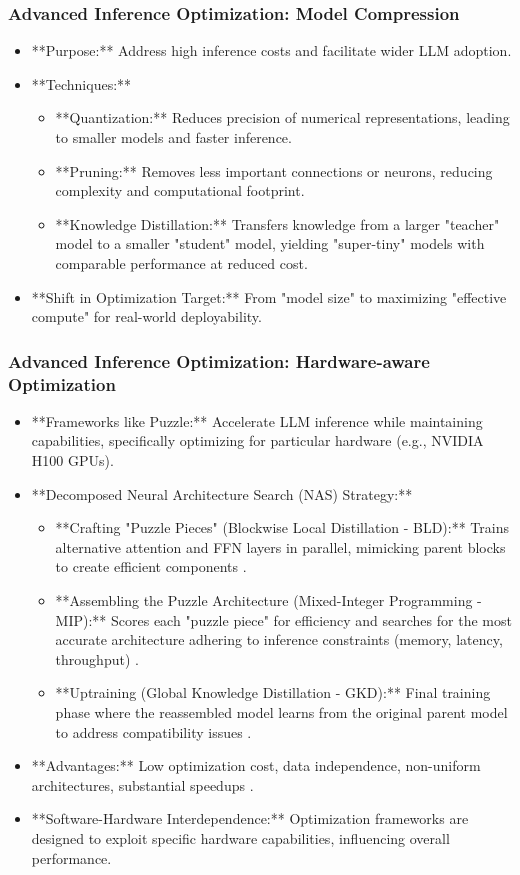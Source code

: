 \documentclass{beamer}       %
\begin{document}
\begin{frame}
    \frametitle{Advanced Inference Optimization: Model Compression}
    \begin{itemize}
        \item **Purpose:** Address high inference costs and facilitate wider LLM adoption.
        \item **Techniques:**
        \begin{itemize}
            \item **Quantization:** Reduces precision of numerical representations, leading to smaller models and faster inference.
            \item **Pruning:** Removes less important connections or neurons, reducing complexity and computational footprint.
            \item **Knowledge Distillation:** Transfers knowledge from a larger "teacher" model to a smaller "student" model, yielding "super-tiny" models with comparable performance at reduced cost.
        \end{itemize}
        \item **Shift in Optimization Target:** From "model size" to maximizing "effective compute" for real-world deployability.
    \end{itemize}
\end{frame}

\begin{frame}
    \frametitle{Advanced Inference Optimization: Hardware-aware Optimization}
    \tiny
    \begin{itemize}
        \item **Frameworks like Puzzle:** Accelerate LLM inference while maintaining capabilities, specifically optimizing for particular hardware (e.g., NVIDIA H100 GPUs).
        \item **Decomposed Neural Architecture Search (NAS) Strategy:**
        \begin{itemize}
        \tiny
            \item **Crafting "Puzzle Pieces" (Blockwise Local Distillation - BLD):** Trains alternative attention and FFN layers in parallel, mimicking parent blocks to create efficient components .
            \item **Assembling the Puzzle Architecture (Mixed-Integer Programming - MIP):** Scores each "puzzle piece" for efficiency and searches for the most accurate architecture adhering to inference constraints (memory, latency, throughput) .
            \item **Uptraining (Global Knowledge Distillation - GKD):** Final training phase where the reassembled model learns from the original parent model to address compatibility issues .
        \end{itemize}
        \item **Advantages:** Low optimization cost, data independence, non-uniform architectures, substantial speedups .
        \item **Software-Hardware Interdependence:** Optimization frameworks are designed to exploit specific hardware capabilities, influencing overall performance.
    \end{itemize}
\end{frame}
\end{document}
